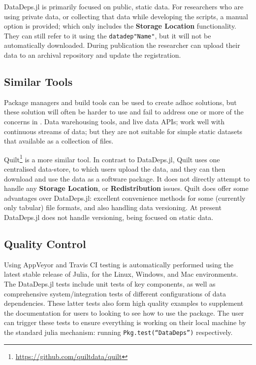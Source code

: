 \documentclass[dvinames]{josr}
\newcommand{\datadep}[1]{\texttt{datadep"{}#1"{}}}
\begin{document}
\noindent DataDeps.jl is primarily focused on public, static data.
For researchers who are using private data, or collecting that data while developing the scripts, a manual option is provided; which only includes the \textbf{Storage Location} functionality. They can still refer to it using the \datadep{Name}, but it will not be automatically downloaded.
During publication the researcher can upload their data to an archival repository and update the registration.



\subsection{Similar Tools}
Package managers and build tools can be used to create adhoc solutions, but these solution will often be harder to use and fail to address one or more of the concerns in .
Data warehousing tools, and live data APIs; work well with continuous streams of data;
but they are not suitable for simple static datasets that available as a collection of files.


Quilt\footnote{\url{https://github.com/quiltdata/quilt}} is a more similar tool.
In contrast to DataDeps.jl, Quilt uses one centralised data-store, to which users upload the data, and they can then download and use the data as a software package.
It does not directly attempt to handle any \textbf{Storage Location}, or \textbf{Redistribution} issues.
%
Quilt does offer some advantages over DataDeps.jl:
excellent convenience methods for some (currently only tabular) file formats, 
and also handling data versioning.
At present DataDeps.jl does not handle versioning, being focused on static data.


\subsection{Quality Control}

Using AppVeyor and Travis CI testing is automatically performed using the latest stable release of Julia, for the Linux, Windows, and Mac environments.
The DataDeps.jl tests include unit tests of key components, as well as comprehensive system/integration tests of different configurations of data dependencies.
These latter tests also form high quality examples to supplement the documentation for users to looking to see how to use the package.
The user can trigger these tests to ensure everything is working on their local machine by the standard julia mechanism: running \texttt{Pkg.test(``DataDeps'')} respectively.
\end{document}
